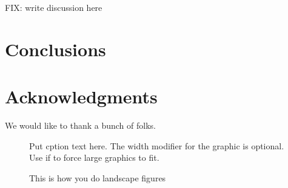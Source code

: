 \documentclass[agupp]{aguplus}
\begin{document}
\begin{article}
FIX: write discussion here


\section{Conclusions}


\section{Acknowledgments}

We would like to thank a bunch of folks.


\end{article}   



\begin{figure}
\caption{Put cption text here.  The width modifier for the graphic is optional.  Use if to force large graphics to fit.}
\label{fig:location}
\end{figure}


\begin{landscape}
\begin{figure}
\begin{center}
\end{center}
\caption{This is how you do landscape figures}
\label{fig:core1}
\end{figure}
\end{landscape}
\end{document}

